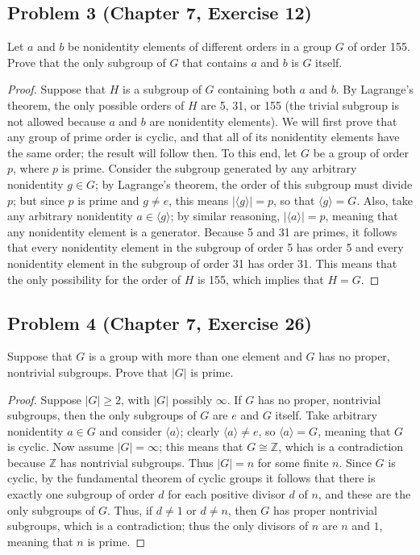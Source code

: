 \documentclass{article}
\begin{document}
\subsection*{Problem 3 (Chapter 7, Exercise 12)}
Let $a$ and $b$ be nonidentity elements of different orders in a group $G$ of order 155. Prove that the only subgroup of $G$ that contains $a$ and $b$ is $G$ itself.
\begin{proof}
Suppose that $H$ is a subgroup of $G$ containing both $a$ and $b$. By Lagrange's theorem, the only possible orders of $H$ are 5, 31, or 155 (the trivial subgroup is not allowed because $a$ and $b$ are nonidentity elements). We will first prove that any group of prime order is cyclic, and that all of its nonidentity elements have the same order; the result will follow then. To this end, let $G$ be a group of order $p$, where $p$ is prime. Consider the subgroup generated by any arbitrary nonidentity $g \in G$; by Lagrange's theorem, the order of this subgroup must divide $p$; but since $p$ is prime and $g \neq e$, this means $|\langle g \rangle| = p$, so that $\langle g \rangle = G$. Also, take any arbitrary nonidentity $a \in \langle g \rangle$; by similar reasoning, $|\langle a \rangle| = p$, meaning that any nonidentity element is a generator. Because 5 and 31 are primes, it follows that every nonidentity element in the subgroup of order 5 has order 5 and every nonidentity element in the subgroup of order 31 has order 31. This means that the only possibility for the order of $H$ is 155, which implies that $H = G$.
\end{proof}

\subsection*{Problem 4 (Chapter 7, Exercise 26)}
Suppose that $G$ is a group with more than one element and $G$ has no proper, nontrivial subgroups. Prove that $|G|$ is prime. 
\begin{proof}
Suppose $|G| \geq 2$, with $|G|$ possibly $\infty$. If $G$ has no proper, nontrivial subgroups, then the only subgroups of $G$ are $e$ and $G$ itself. Take arbitrary nonidentity $a \in G$ and consider $\langle a \rangle$; clearly $\langle a \rangle \neq e$, so $\langle a \rangle = G$, meaning that $G$ is cyclic. Now assume $|G| = \infty$; this means that $G \cong \mathbb{Z}$, which is a contradiction because $\mathbb{Z}$ has nontrivial subgroups. Thus $|G| = n$ for some finite $n$. Since $G$ is cyclic, by the fundamental theorem of cyclic groups it follows that there is exactly one subgroup of order $d$ for each positive divisor $d$ of $n$, and these are the only subgroups of $G$. Thus, if $d \neq 1$ or $d \neq n$, then $G$ has proper nontrivial subgroups, which is a contradiction; thus the only divisors of $n$ are $n$ and $1$, meaning that $n$ is prime.
\end{proof}
\end{document}
